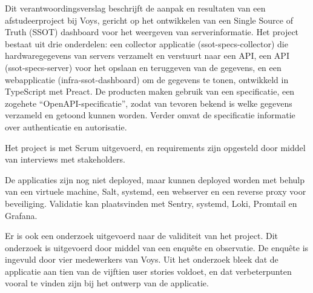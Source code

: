 \documentclass[../report.tex]{subfiles}
\begin{document}
Dit verantwoordingsverslag beschrijft de aanpak en resultaten van een afstudeerproject bij Voys, gericht op het ontwikkelen van een Single Source of Truth (SSOT) dashboard voor het weergeven van serverinformatie. Het project bestaat uit drie onderdelen: een collector applicatie (ssot-specs-collector) die hardwaregegevens van servers verzamelt en verstuurt naar een API, een API (ssot-specs-server) voor het opslaan en teruggeven van de gegevens, en een webapplicatie (infra-ssot-dashboard) om de gegevens te tonen, ontwikkeld in TypeScript met Preact. De producten maken gebruik van een specificatie, een zogehete ``\gls*{OpenAPI-specificatie}'', zodat van tevoren bekend is welke gegevens verzameld en getoond kunnen worden. Verder omvat de specificatie informatie over authenticatie en autorisatie.

Het project is met Scrum uitgevoerd, en requirements zijn opgesteld door middel van interviews met stakeholders.

De applicaties zijn nog niet deployed, maar kunnen deployed worden met behulp van een virtuele machine, Salt, systemd, een webserver en een reverse proxy voor beveiliging. Validatie kan plaatsvinden met Sentry, systemd, Loki, Promtail en Grafana.

Er is ook een onderzoek uitgevoerd naar de validiteit van het project. Dit onderzoek is uitgevoerd door middel van een enquête en observatie. De enquête is ingevuld door vier medewerkers van Voys. Uit het onderzoek bleek dat de applicatie aan tien van de vijftien user stories voldoet, en dat verbeterpunten vooral te vinden zijn bij het ontwerp van de applicatie.
\end{document}
